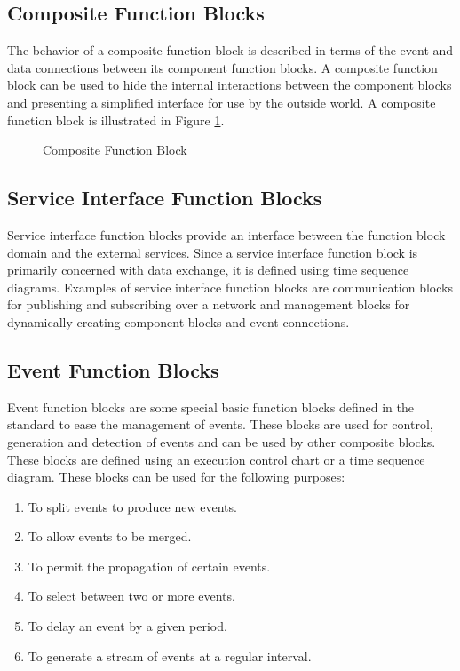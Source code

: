 \subsection{Composite Function Blocks} 
The behavior of a composite function block is described in
terms of the event and data connections between its
component function blocks. A composite function block can be
used to hide the internal interactions between the component
blocks and presenting a simplified interface for use by the
outside world. A composite function block is illustrated in
Figure \ref{f:Composite_Block}.

\begin{figure}
  \begin{center}
    \caption[Composite Function Block]
            {Composite Function Block{\protect ~\cite{iec:614991:2000}}} 
        \label{f:Composite_Block}
  \end{center}
\end{figure}

\subsection{Service Interface Function Blocks} 
Service interface function blocks provide an interface
between the function block domain and the external services.
Since a service interface function block is primarily
concerned with data exchange, it is defined using time
sequence diagrams. Examples of service interface function
blocks are communication blocks for publishing and
subscribing over a network and management blocks for
dynamically creating component blocks and event connections.
  
\subsection{Event Function Blocks} 
Event function blocks are some special basic function blocks
defined in the standard to ease the management of events.
These blocks are used for control, generation and detection
of events and can be used by other composite blocks. These
blocks are defined using an execution control chart or a
time sequence diagram. These blocks can be used for the
following purposes:
\begin{enumerate}
\item To split events to produce new events.
\item To allow events to be merged.
\item To permit the propagation of certain events.
\item To select between two or more events.
\item To delay an event by a given period.
\item To generate a stream of events at a regular interval.
\end{enumerate}




